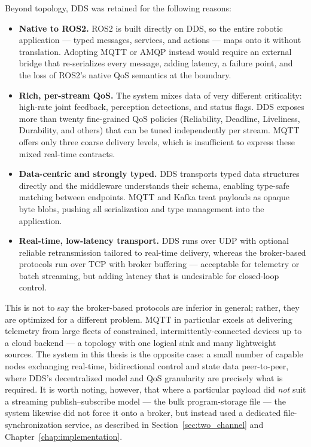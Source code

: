 Beyond topology, DDS was retained for the following reasons:

\begin{itemize}
    \item \textbf{Native to ROS2.} ROS2 is built directly on DDS, so the entire robotic application --- typed messages, services, and actions --- maps onto it without translation. Adopting MQTT or AMQP instead would require an external bridge that re-serializes every message, adding latency, a failure point, and the loss of ROS2's native QoS semantics at the boundary.
    \item \textbf{Rich, per-stream QoS.} The system mixes data of very different criticality: high-rate joint feedback, perception detections, and status flags. DDS exposes more than twenty fine-grained QoS policies (Reliability, Deadline, Liveliness, Durability, and others) that can be tuned independently per stream. MQTT offers only three coarse delivery levels, which is insufficient to express these mixed real-time contracts.
    \item \textbf{Data-centric and strongly typed.} DDS transports typed data structures directly and the middleware understands their schema, enabling type-safe matching between endpoints. MQTT and Kafka treat payloads as opaque byte blobs, pushing all serialization and type management into the application.
    \item \textbf{Real-time, low-latency transport.} DDS runs over UDP with optional reliable retransmission tailored to real-time delivery, whereas the broker-based protocols run over TCP with broker buffering --- acceptable for telemetry or batch streaming, but adding latency that is undesirable for closed-loop control.
\end{itemize}

This is not to say the broker-based protocols are inferior in general; rather, they are optimized for a different problem. MQTT in particular excels at delivering telemetry from large fleets of constrained, intermittently-connected devices up to a cloud backend --- a topology with one logical sink and many lightweight sources. The system in this thesis is the opposite case: a small number of capable nodes exchanging real-time, bidirectional control and state data peer-to-peer, where DDS's decentralized model and QoS granularity are precisely what is required. It is worth noting, however, that where a particular payload did \textit{not} suit a streaming publish--subscribe model --- the bulk program-storage file --- the system likewise did not force it onto a broker, but instead used a dedicated file-synchronization service, as described in Section~\ref{sec:two_channel} and Chapter~\ref{chap:implementation}.

